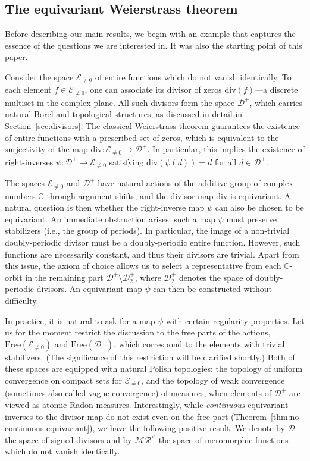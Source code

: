 \documentclass[12pt]{paper}
\numberwithin{equation}{section}
\theoremstyle{plain}
\theoremstyle{definition}
\newcommand{\C}{\mathbb{C}}
\newcommand{\merom}[1][]{\mathcal{MR}_{#1}}
\newcommand{\meromnz}{\merom^{\times}}
\newcommand{\holom}[1][]{\mathcal{E}_{#1}}
\newcommand{\divis}[1][]{\mathcal{D}_{#1}}
\newcommand{\divisp}[1][]{\divis[#1]^{+}}
\newcommand{\dm}{\mathrm{div}}      %
\newcommand{\free}{\mathrm{Free}}
\begin{document}
\subsection{The equivariant Weierstrass theorem}
\label{sec:motiv-example}
Before describing our main results, we begin with an example that captures the essence of the
questions we are interested in. It was also the starting point of this paper.

Consider the space \(\holom[\ne 0]\) of entire functions which do not vanish identically.  To each
element \(f \in \holom[\ne 0]\), one can associate its divisor of zeros \(\dm(f)\)---a discrete
multiset in the complex plane.  All such divisors form the space \(\divisp\), which carries natural
Borel and topological structures, as discussed in detail in Section~\ref{sec:divisors}.  The
classical Weierstrass theorem guarantees the existence of entire functions with a prescribed set of
zeros, which is equivalent to the surjectivity of the map \(\dm : \holom[\ne 0] \to \divisp\).  In
particular, this implies the existence of right-inverses \(\psi : \divisp \to \holom[\ne 0]\)
satisfying \(\dm(\psi(d)) = d\) for all \(d \in \divisp\).

The spaces \(\holom[\ne 0]\) and \(\divisp\) have natural actions of the additive group of complex
numbers \(\C\) through argument shifts, and the divisor map \(\dm\) is equivariant.  A natural
question is then whether the right-inverse map \(\psi\) can also be chosen to be equivariant. An
immediate obstruction arises: such a map \(\psi\) must preserve stabilizers (i.e., the group of
periods). In particular, the image of a non-trivial doubly-periodic divisor must be a
doubly-periodic entire function.  However, such functions are necessarily constant, and thus their
divisors are trivial.  Apart from this issue, the axiom of choice allows us to select a
representative from each \(\C\)-orbit in the remaining part \(\divisp\setminus \divisp[2]\), where
\(\divisp[2]\) denotes the space of doubly-periodic divisors.  An equivariant map \(\psi\) can then
be constructed without difficulty.

In practice, it is natural to ask for a map \(\psi\) with certain regularity properties.  Let us for
the moment restrict the discussion to the free parts of the actions, \(\free(\holom[\ne 0])\) and
\(\free(\divisp)\), which correspond to the elements with trivial stabilizers. (The significance of
this restriction will be clarified shortly.)  Both of these spaces are equipped with natural Polish
topologies: the topology of uniform convergence on compact sets for \(\holom[\ne 0]\), and the
topology of weak convergence (sometimes also called vague convergence) of measures, when elements of
\(\divisp\) are viewed as atomic Radon measures.  Interestingly, while \emph{continuous} equivariant
inverses to the divisor map do not exist even on the free part
(Theorem~\ref{thm:no-continuous-equivariant}),
we have the following positive result. We denote by \(\divis\) the space of signed divisors and by
\(\meromnz\) the space of meromorphic functions which do not vanish identically.
\end{document}
